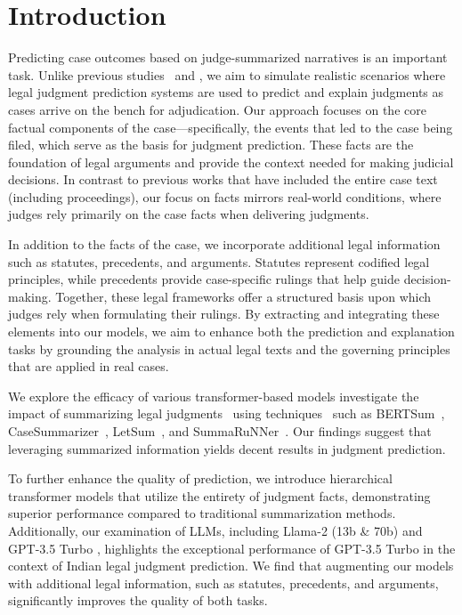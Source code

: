 \section{Introduction}
Predicting case outcomes based on judge-summarized narratives is an important task. Unlike previous studies~\cite{malik-etal-2021-ildc, nigam-etal-2024-legal} and \cite{vats2023llms}, we aim to simulate realistic scenarios where legal judgment prediction systems are used to predict and explain judgments as cases arrive on the bench for adjudication. Our approach focuses on the core factual components of the case—specifically, the events that led to the case being filed, which serve as the basis for judgment prediction. These facts are the foundation of legal arguments and provide the context needed for making judicial decisions. In contrast to previous works that have included the entire case text (including proceedings), our focus on facts mirrors real-world conditions, where judges rely primarily on the case facts when delivering judgments.

In addition to the facts of the case, we incorporate additional legal information such as statutes, precedents, and arguments. Statutes represent codified legal principles, while precedents provide case-specific rulings that help guide decision-making. Together, these legal frameworks offer a structured basis upon which judges rely when formulating their rulings. By extracting and integrating these elements into our models, we aim to enhance both the prediction and explanation tasks by grounding the analysis in actual legal texts and the governing principles that are applied in real cases.

We explore the efficacy of various transformer-based models investigate the impact of summarizing legal judgments~\cite{xx4,xx9,xx10,xx11} using techniques~\cite{xx1,xx2,xx16,xx12} such as BERTSum~\cite{liu2019fine}, CaseSummarizer~\cite{polsley2016casesummarizer}, LetSum~\cite{farzindar2004atefeh}, and SummaRuNNer~\cite{nallapati2017summarunner}. Our findings suggest that leveraging summarized information yields decent results in judgment prediction. 

To further enhance the quality of prediction, we introduce hierarchical transformer models that utilize the entirety of judgment facts, demonstrating superior performance compared to traditional summarization methods. Additionally, our examination of LLMs, including Llama-2 (13b \& 70b) \cite{touvron2023llama} and GPT-3.5 Turbo \cite{brown2020language}, highlights the exceptional performance of GPT-3.5 Turbo in the context of Indian legal judgment prediction. We find that augmenting our models with additional legal information, such as statutes, precedents, and arguments, significantly improves the quality of both tasks.

